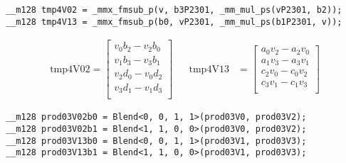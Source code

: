 \documentclass[fontsize = 10pt,DIV = 13]{scrartcl}
\begin{document}
\begin{verbatim}
__m128 tmp4V02 = _mmx_fmsub_p(v, b3P2301, _mm_mul_ps(vP2301, b2));
__m128 tmp4V13 = _mmx_fmsub_p(b0, vP2301, _mm_mul_ps(b1P2301, v));
\end{verbatim}

\begin{align*}
\mathrm{tmp4V02} 
=
\begin{bmatrix}
v_0b_2- v_2b_0\\
v_1b_3- v_3b_1\\
v_2d_0- v_0d_2\\
v_3d_1- v_1d_3\\
\end{bmatrix}
&&
\mathrm{tmp4V13} 
&=
\begin{bmatrix}
a_0v_2 - a_2v_0\\
a_1v_3 - a_3v_1\\
c_2v_0 - c_0v_2\\
c_3v_1 - c_1v_3\\
\end{bmatrix}
\end{align*}

\begin{verbatim}
__m128 prod03V02b0 = Blend<0, 0, 1, 1>(prod03V0, prod03V2);
__m128 prod03V02b1 = Blend<1, 1, 0, 0>(prod03V0, prod03V2);
__m128 prod03V13b0 = Blend<0, 0, 1, 1>(prod03V1, prod03V3);
__m128 prod03V13b1 = Blend<1, 1, 0, 0>(prod03V1, prod03V3);
\end{verbatim}
\end{document}
